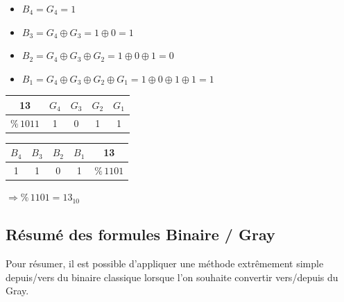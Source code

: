 \documentclass[11pt,a4paper]{article}
\begin{document}
\begin{table}[!ht]
  \centering
  \begin{minipage}{0.60\textwidth}

\begin{itemize}
\item $ B_{4} = G_{4} = 1 $
\item $ B_{3} = G_{4} \oplus G_{3} = 1 \oplus 0 = 1 $
\item $ B_{2} = G_{4} \oplus G_{3} \oplus G_{2} = 1 \oplus 0 \oplus 1 = 0 $
\item $ B_{1} = G_{4} \oplus G_{3} \oplus G_{2} \oplus G_{1} = 1 \oplus 0 \oplus 1 \oplus 1 = 1 $
\end{itemize}

  \end{minipage}
  \hfillx
  \begin{minipage}{0.40\textwidth}
    \centering

\begin{tabular}{ c  | c | c | c | c | }
13                    & $G_{4}$ & $G_{3}$ & $G_{2}$ & $G_{1}$ \\
\hline
$ \text{\%} \, 1011 $ & 1 & 0 & 1 & 1 \\
\end{tabular}

\bigskip

\begin{tabular}{ | c | c | c | c |   c }
$B_{4}$ & $B_{3}$ & $B_{2}$ & $B_{1}$  & 13\\
\hline
1 & 1 & 0 & 1                          & $ \text{\%} \, 1101 $\\
\end{tabular}

\bigskip

$ \Rightarrow \text{\%} \, 1101 = 13_{10}$

  \end{minipage}
\end{table}


\clearpage


\subsection{Résumé des formules Binaire / Gray}

\bigskip

Pour résumer, il est possible d'appliquer une méthode extrêmement simple depuis/vers du binaire classique lorsque l'on souhaite convertir vers/depuis du Gray.
\end{document}
